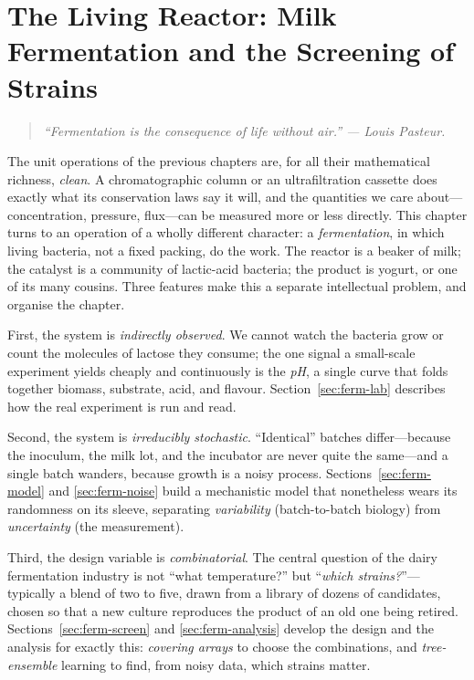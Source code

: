 \chapter{The Living Reactor: Milk Fermentation and the Screening of Strains}
\label{ch:ferment}

\begin{quote}\itshape
``Fermentation is the consequence of life without air.'' --- Louis Pasteur.
\end{quote}

\noindent
The unit operations of the previous chapters are, for all their mathematical
richness, \emph{clean}. A chromatographic column or an ultrafiltration cassette
does exactly what its conservation laws say it will, and the quantities we care
about---concentration, pressure, flux---can be measured more or less directly.
This chapter turns to an operation of a wholly different character: a
\emph{fermentation}, in which living bacteria, not a fixed packing, do the work.
The reactor is a beaker of milk; the catalyst is a community of lactic-acid
bacteria; the product is yogurt, or one of its many cousins. Three features make
this a separate intellectual problem, and organise the chapter.

First, the system is \emph{indirectly observed}. We cannot watch the bacteria
grow or count the molecules of lactose they consume; the one signal a small-scale
experiment yields cheaply and continuously is the \emph{pH}, a single curve that
folds together biomass, substrate, acid, and flavour. Section~\ref{sec:ferm-lab}
describes how the real experiment is run and read.

Second, the system is \emph{irreducibly stochastic}. ``Identical'' batches
differ---because the inoculum, the milk lot, and the incubator are never quite the
same---and a single batch wanders, because growth is a noisy process.
Sections~\ref{sec:ferm-model} and \ref{sec:ferm-noise} build a mechanistic model
that nonetheless wears its randomness on its sleeve, separating \emph{variability}
(batch-to-batch biology) from \emph{uncertainty} (the measurement).

Third, the design variable is \emph{combinatorial}. The central question of the
dairy fermentation industry is not ``what temperature?'' but ``\emph{which
strains?}''---typically a blend of two to five, drawn from a library of dozens of
candidates, chosen so that a new culture reproduces the product of an old one
being retired. Sections~\ref{sec:ferm-screen} and \ref{sec:ferm-analysis} develop
the design and the analysis for exactly this: \emph{covering arrays} to choose the
combinations, and \emph{tree-ensemble} learning to find, from noisy data, which
strains matter.

